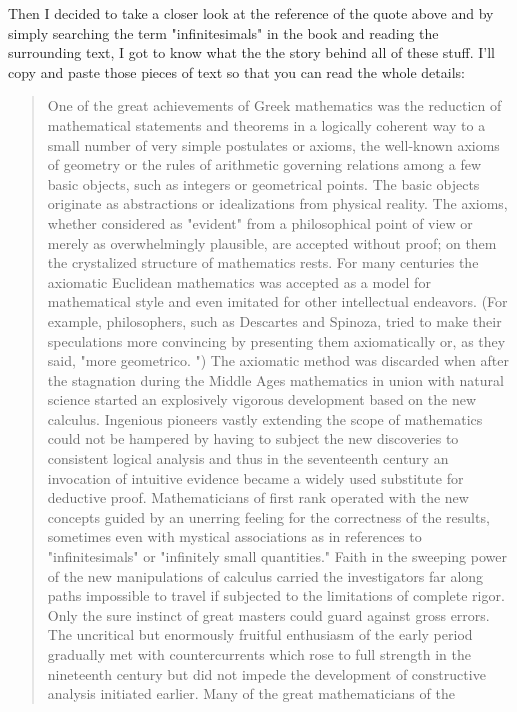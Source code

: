\documentclass[11pt,a4paper]{article}
\begin{document}
Then I decided to take a closer look at the reference of the quote above and by simply searching the term "infinitesimals" in the book and reading the surrounding text, I got to know what the the story behind all of these stuff. I'll copy and paste those pieces of text so that you can read the whole details:

\begin{quote}
	One of the great achievements of Greek mathematics was the
	reducticn of mathematical statements and theorems in a logically
	coherent way to a small number of very simple postulates or axioms,
	the well-known axioms of geometry or the rules of arithmetic governing
	relations among a few basic objects, such as integers or geometrical
	points. The basic objects originate as abstractions or idealizations
	from physical reality. The axioms, whether considered as "evident"
	from a philosophical point of view or merely as overwhelmingly
	plausible, are accepted without proof; on them the crystalized structure
	of mathematics rests. For many centuries the axiomatic Euclidean mathematics was accepted as a model for mathematical style and even
	imitated for other intellectual endeavors. (For example, philosophers,
	such as Descartes and Spinoza, tried to make their speculations more
	convincing by presenting them axiomatically or, as they said, "more
	geometrico. ")
	The axiomatic method was discarded when after the stagnation during
	the Middle Ages mathematics in union with natural science started an
	explosively vigorous development based on the new calculus. Ingenious
	pioneers vastly extending the scope of mathematics could not be
	hampered by having to subject the new discoveries to consistent
	logical analysis and thus in the seventeenth century an invocation of
	intuitive evidence became a widely used substitute for deductive proof.
	Mathematicians of first rank operated with the new concepts guided
	by an unerring feeling for the correctness of the results, sometimes
	even with mystical associations as in references to "infinitesimals" or
	"infinitely small quantities." Faith in the sweeping power of the new
	manipulations of calculus carried the investigators far along paths
	impossible to travel if subjected to the limitations of complete rigor.
	Only the sure instinct of great masters could guard against gross errors.
	The uncritical but enormously fruitful enthusiasm of the early period
	gradually met with countercurrents which rose to full strength in the
	nineteenth century but did not impede the development of constructive
	analysis initiated earlier. Many of the great mathematicians of the

\end{quote}
\end{document}
